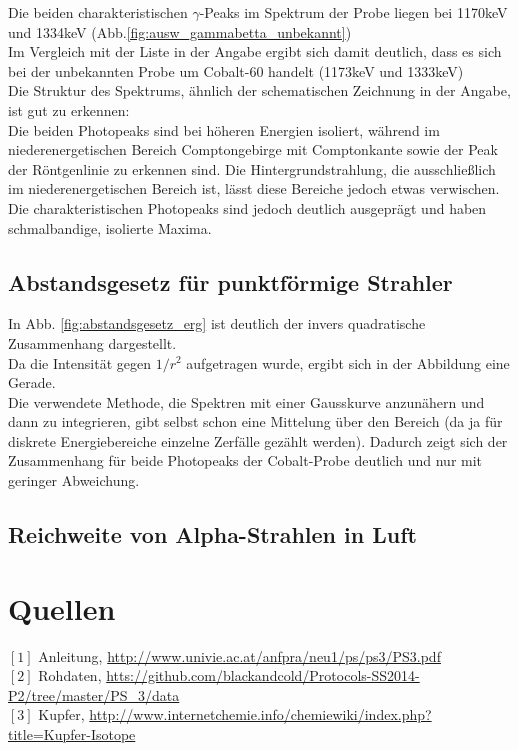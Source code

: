 \documentclass[12pt,a4paper]{article}
\begin{document}
\begin{multicols}{2}
Die beiden charakteristischen $\gamma$-Peaks im Spektrum der Probe liegen bei 1170keV und 1334keV (Abb.\ref{fig:ausw_gammabetta_unbekannt})\\
Im Vergleich mit der Liste in der Angabe ergibt sich damit deutlich, dass es sich bei der unbekannten Probe um Cobalt-60 handelt (1173keV und 1333keV)\\

\noindent Die Struktur des Spektrums, ähnlich der schematischen Zeichnung in der Angabe, ist gut zu erkennen:\\
Die beiden Photopeaks sind bei höheren Energien isoliert, während im niederenergetischen Bereich Comptongebirge mit Comptonkante sowie der Peak der Röntgenlinie zu erkennen sind. Die Hintergrundstrahlung, die ausschließlich im niederenergetischen Bereich ist, lässt diese Bereiche jedoch etwas verwischen.\\

\noindent Die charakteristischen Photopeaks sind jedoch deutlich ausgeprägt und haben schmalbandige, isolierte Maxima.

\subsection{Abstandsgesetz für punktförmige Strahler}

In Abb. \ref{fig:abstandsgesetz_erg} ist deutlich der invers quadratische Zusammenhang dargestellt.\\
Da die Intensität gegen $1/r^2$ aufgetragen wurde, ergibt sich in der Abbildung eine Gerade.\\

\noindent Die verwendete Methode, die Spektren mit einer Gausskurve anzunähern und dann zu integrieren, gibt selbst schon eine Mittelung über den Bereich (da ja für diskrete Energiebereiche einzelne Zerfälle gezählt werden). Dadurch zeigt sich der Zusammenhang für beide Photopeaks der Cobalt-Probe deutlich und nur mit geringer Abweichung.

\subsection{Reichweite von Alpha-Strahlen in Luft}



\section{Quellen}
$[1]$ Anleitung, \url{http://www.univie.ac.at/anfpra/neu1/ps/ps3/PS3.pdf}\\
$[2]$ Rohdaten, \url{htts://github.com/blackandcold/Protocols-SS2014-P2/tree/master/PS_3/data}\\
$[3]$ Kupfer, \url{http://www.internetchemie.info/chemiewiki/index.php?title=Kupfer-Isotope}
\end{multicols}
\end{document}
